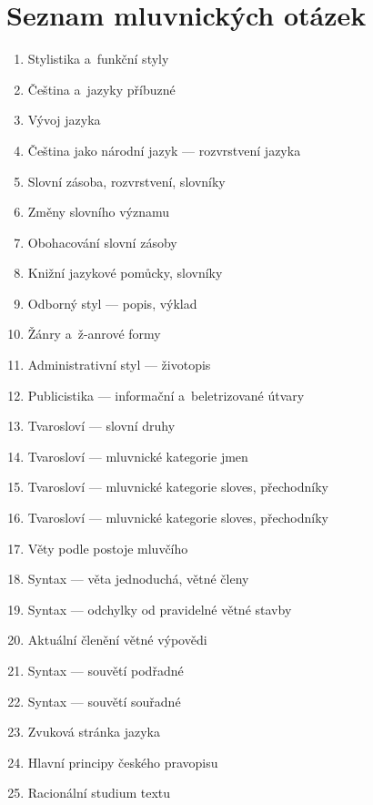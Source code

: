 \chapter{Seznam mluvnických otázek}
\begin{enumerate}
\item Stylistika a~funkční styly
\item Čeština a~jazyky příbuzné
\item Vývoj jazyka
\item Čeština jako národní jazyk --- rozvrstvení jazyka
\item Slovní zásoba, rozvrstvení, slovníky
\item Změny slovního významu
\item Obohacování slovní zásoby  
\item Knižní jazykové pomůcky, slovníky
\item Odborný styl --- popis, výklad
\item Žánry a~ž-anrové formy
\item Administrativní styl --- životopis
\item Publicistika --- informační a~beletrizované útvary
\item Tvarosloví --- slovní druhy   
\item Tvarosloví --- mluvnické kategorie jmen
\item Tvarosloví --- mluvnické kategorie sloves, přechodníky
\item Tvarosloví --- mluvnické kategorie sloves, přechodníky
\item Věty podle postoje mluvčího
\item Syntax --- věta jednoduchá, větné členy
\item Syntax --- odchylky od pravidelné větné stavby
\item Aktuální členění větné výpovědi
\item Syntax --- souvětí podřadné
\item Syntax --- souvětí souřadné
\item Zvuková stránka jazyka
\item Hlavní principy českého pravopisu
\item Racionální studium textu
\end{enumerate}